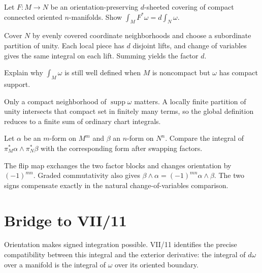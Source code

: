 \begin{problem}\label{prob:vii10-ch03}
Let $F:M\to N$ be an orientation-preserving $d$-sheeted covering of compact connected oriented $n$-manifolds. Show $\int_MF^*\omega=d\int_N\omega$.
\end{problem}
\begin{solution}
Cover $N$ by evenly covered coordinate neighborhoods and choose a subordinate partition of unity. Each local piece has $d$ disjoint lifts, and change of variables gives the same integral on each lift. Summing yields the factor $d$.
\end{solution}

\begin{problem}\label{prob:vii10-ch04}
Explain why $\int_M\omega$ is still well defined when $M$ is noncompact but $\omega$ has compact support.
\end{problem}
\begin{solution}
Only a compact neighborhood of $\operatorname{supp}\omega$ matters. A locally finite partition of unity intersects that compact set in finitely many terms, so the global definition reduces to a finite sum of ordinary chart integrals.
\end{solution}

\begin{problem}\label{prob:vii10-ch05}
Let $\alpha$ be an $m$-form on $M^m$ and $\beta$ an $n$-form on $N^n$. Compare the integral of $\pi_M^*\alpha\wedge\pi_N^*\beta$ with the corresponding form after swapping factors.
\end{problem}
\begin{solution}
The flip map exchanges the two factor blocks and changes orientation by $(-1)^{mn}$. Graded commutativity also gives $\beta\wedge\alpha=(-1)^{mn}\alpha\wedge\beta$. The two signs compensate exactly in the natural change-of-variables comparison.
\end{solution}

\section*{Bridge to VII/11}
Orientation makes signed integration possible. VII/11 identifies the precise compatibility between this integral and the exterior derivative: the integral of $d\omega$ over a manifold is the integral of $\omega$ over its oriented boundary.
